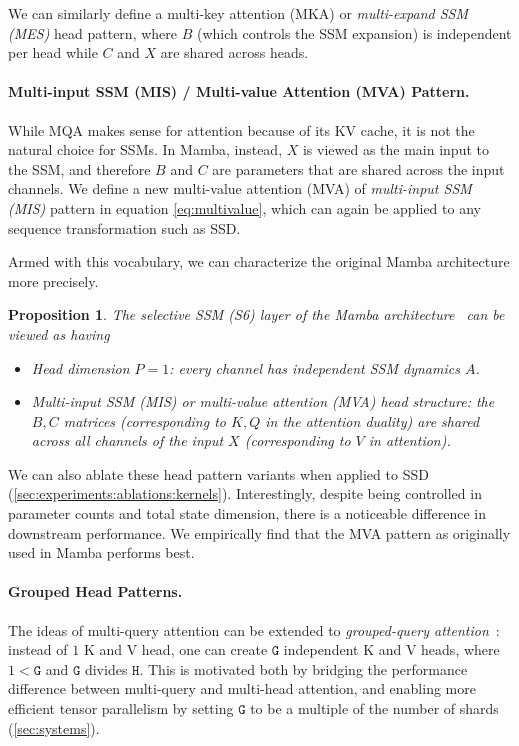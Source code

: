 \documentclass{article}
\newcommand{\citep}{\parencite}
\newtheorem{proposition}[theorem]{Proposition}
\begin{document}
We can similarly define a multi-key attention (MKA) or \emph{multi-expand SSM (MES)} head pattern,
where $B$ (which controls the SSM expansion) is independent per head while $C$ and $X$ are shared across heads.

\paragraph{Multi-input SSM (MIS) / Multi-value Attention (MVA) Pattern.}

While MQA makes sense for attention because of its KV cache, it is not the natural choice for SSMs.
In Mamba, instead, $X$ is viewed as the main input to the SSM,
and therefore $B$ and $C$ are parameters that are shared across the input channels.
We define a new multi-value attention (MVA) of \emph{multi-input SSM (MIS)} pattern in equation \eqref{eq:multivalue}, which can again be applied to any sequence transformation such as SSD.

Armed with this vocabulary, we can characterize the original Mamba architecture more precisely.
\begin{proposition}
  \label{prop:mamba-multihead}
  The selective SSM (S6) layer of the Mamba architecture~\citep{gu2023mamba} can be viewed as having
  \begin{itemize}
    \item Head dimension $P=1$: every channel has independent SSM dynamics $A$.
    \item \emph{Multi-input SSM} (MIS) or \emph{multi-value attention} (MVA) head structure: the $B, C$ matrices (corresponding to $K, Q$ in the attention duality) are shared across all channels of the input $X$ (corresponding to $V$ in attention).
  \end{itemize}
\end{proposition}

We can also ablate these head pattern variants when applied to SSD (\cref{sec:experiments:ablations:kernels}).
Interestingly, despite being controlled in parameter counts and total state dimension,
there is a noticeable difference in downstream performance.
We empirically find that the MVA pattern as originally used in Mamba performs best.

\paragraph{Grouped Head Patterns.}

The ideas of multi-query attention can be extended to \emph{grouped-query attention}~\citep{ainslie2023gqa}: instead of $1$ K and V head, one can create $\mathtt{G}$ independent K and V heads, where $1 < \mathtt{G}$ and $\mathtt{G}$ divides $\mathtt{H}$.
This is motivated both by bridging the performance difference between multi-query and multi-head attention,
and enabling more efficient tensor parallelism by setting $\mathtt{G}$ to be a multiple of the number of shards (\cref{sec:systems}).
\end{document}
